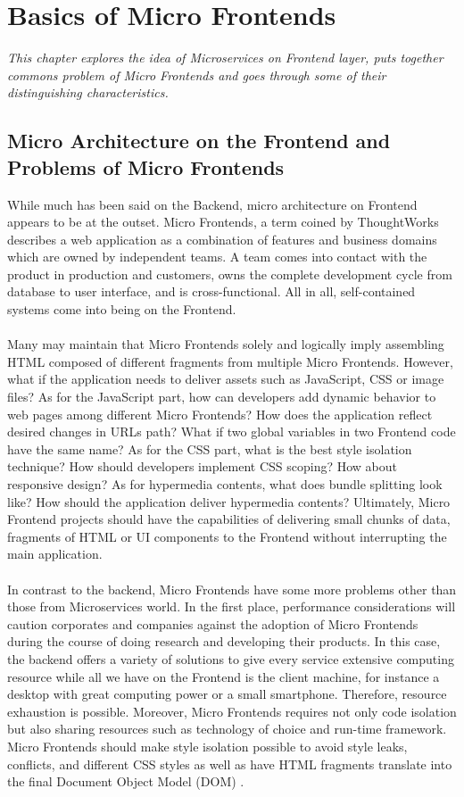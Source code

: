 \documentclass[a4paper]{book}
\begin{document}
\chapter{Basics of Micro Frontends}
\textit{This chapter explores the idea of Microservices on Frontend layer, puts together commons problem of Micro Frontends and goes through some of their distinguishing characteristics.}
\section{Micro Architecture on the Frontend and Problems of Micro Frontends}
While much has been said on the Backend, micro architecture on Frontend appears to be at the outset. Micro Frontends, a term coined by ThoughtWorks describes a web application as a combination of features and business domains which are owned by independent teams. A team comes into contact with the product in production and customers, owns the complete development cycle from database to user interface, and is cross-functional. All in all, self-contained systems come into being on the Frontend. \cite{micro-frontends.org}
\\ \\
Many may maintain that Micro Frontends solely and logically imply assembling HTML composed of different fragments from multiple Micro Frontends. However, what if the application needs to deliver assets such as JavaScript, CSS or image files? As for the JavaScript part, how can developers add dynamic behavior to web pages among different Micro Frontends? How does the application reflect desired changes in URLs path? What if two global variables in two Frontend code have the same name? As for the CSS part, what is the best style isolation technique? How should developers implement CSS scoping? How about responsive design? As for hypermedia contents, what does bundle splitting look like? How should the application deliver hypermedia contents? Ultimately, Micro Frontend projects should have the capabilities of delivering small chunks of data, fragments of HTML or UI components to the Frontend without interrupting the main application.
\\ \\
In contrast to the backend, Micro Frontends have some more problems other than those from Microservices world. In the first place, performance considerations will caution corporates and companies against the adoption of Micro Frontends during the course of doing research and developing their products. In this case, the backend offers a variety of solutions to give every service extensive computing resource while all we have on the Frontend is the client machine, for instance a desktop with great computing power or a small smartphone. Therefore, resource exhaustion is possible. Moreover, Micro Frontends requires not only code isolation but also sharing resources such as technology of choice and run-time framework. Micro Frontends should make style isolation possible to avoid style leaks, conflicts, and different CSS styles as well as have HTML fragments translate into the final Document Object Model (DOM) \cite{DOM}.
\end{document}
